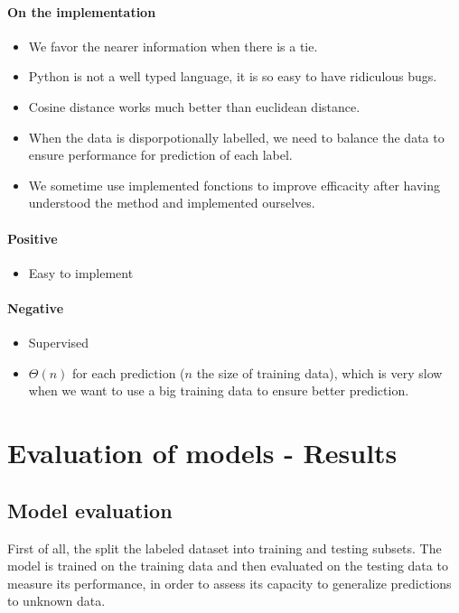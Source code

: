 \documentclass{article}
\begin{document}
\paragraph{On the implementation} \begin{itemize}
  \item We favor the nearer information when there is a tie.
  \item Python is not a well typed language, it is so easy to have
  ridiculous bugs.
  \item Cosine distance works much better than euclidean distance.
  \item When the data is disporpotionally labelled, we need to balance the data to ensure performance for prediction of each label.
  \item We sometime use implemented fonctions to improve
  efficacity after having understood the method and
  implemented ourselves.
\end{itemize}

\paragraph{Positive} \begin{itemize}
  \item Easy to implement
\end{itemize}

\paragraph{Negative} \begin{itemize}
  \item Supervised
  \item $\Theta(n)$ for each prediction ($n$ the size of training data), which is
  very slow when we want to use a big training data to ensure better prediction.
\end{itemize}

\section{Evaluation of models - Results}

\subsection{Model evaluation}

First of all, the split the labeled dataset into training and testing subsets. The model is trained on the training data and then evaluated on the testing data to measure its performance, in order to assess its capacity to generalize predictions to unknown data.
\end{document}
